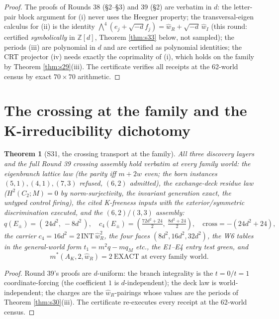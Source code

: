 \documentclass[11pt]{article}
\newtheorem{theorem}{Theorem}[section]
\begin{document}
\begin{proof}
The proofs of Rounds 38 (\S2--\S3) and 39 (\S2) are verbatim in $d$: the
letter-pair block argument for (i) never uses the Heegner property; the
transversal-eigen calculus for (ii) is the identity
$\bigwedge^4(e_j + \sqrt{-d} f_j) = \hat w_R + \sqrt{-d}\,\hat w_I$
(this round: certified \emph{symbolically} in $\mathbb{Z}[d]$, Theorem
\ref{thm:s33} below, not sampled); the periods (iii) are polynomial in
$d$ and are certified as polynomial identities; the CRT projector (iv)
needs exactly the coprimality of (i), which holds on the family by
Theorem \ref{thm:s29}(iii). The certificate verifies all receipts at the
62-world census by exact $70\times 70$ arithmetic.
\end{proof}

\section{The crossing at the family and the K-irreducibility dichotomy}

\begin{theorem}[S31, the crossing transport at the family]\label{thm:s31}
All three discovery layers and the full Round 39 crossing assembly hold
verbatim at every family world: the eigenbranch lattice law (the parity
iff $m + 2w$ even; the born instances $(5,1), (4,1), (7,3)$ refused,
$(6,2)$ admitted), the exchange-deck residue law ($H^2(C_2; M) = 0$ by
norm-surjectivity, the invariant generation exact, the untyped control
firing), the cited K-freeness inputs with the exterior/symmetric
discrimination executed, and the $(6,2)/(3,3)$ assembly:
\[
q(E_\pm) = (\,24d^2,\ -8d^2\,),\quad
c_4(E_\pm) = \left(\tfrac{72d^2+24}{2},\ \tfrac{8d^2+24}{2}\right),\quad
\text{cross} = -(24d^2+24),
\]
the carrier $c_4 = 16d^2 = 2\,\mathrm{INT}\,\hat w_R^2$, the four faces
$(8d^2, 16d^2, 32d^2)$, the W6 tables in the general-world form
$t_1 = m^2 q - mq_M$ etc., the E1--E4 entry test green, and
\[
\boxed{\;m^*(A_K, 2, \hat w_R) = 2\ \text{EXACT at every family world.}\;}
\]
\end{theorem}

\begin{proof}
Round 39's proofs are $d$-uniform: the branch integrality is the
$t=0/t=1$ coordinate-forcing (the coefficient $1$ is $d$-independent);
the deck law is world-independent; the charges are the
$\hat w_R$-pairings whose values are the periods of Theorem
\ref{thm:s30}(iii). The certificate re-executes every receipt at the
62-world census.
\end{proof}
\end{document}
